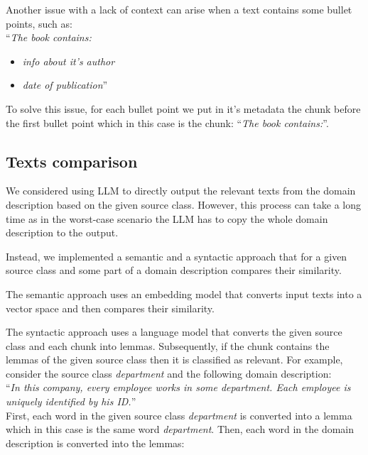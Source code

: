 Another issue with a lack of context can arise when a text contains some bullet points, such as: \\

\noindent{}``\textit{The book contains:}
\begin{itemize}
\item \textit{info about it's author}
\item \textit{date of publication}'' \\
\end{itemize}

\noindent{}To solve this issue, for each bullet point we put in it's metadata the chunk before the first bullet point which in this case is the chunk: ``\textit{The book contains:}''.



\subsection{Texts comparison}
\label{texts_comparison}
  
We considered using LLM to directly output the relevant texts from the domain description based on the given source class. However, this process can take a long time as in the worst-case scenario the LLM has to copy the whole domain description to the output.

Instead, we implemented a semantic and a syntactic approach that for a given source class and some part of a domain description compares their similarity.
 
The semantic approach uses an embedding model that converts input texts into a vector space and then compares their similarity.

The syntactic approach uses a language model that converts the given source class and each chunk into lemmas. Subsequently, if the chunk contains the lemmas of the given source class then it is classified as relevant. For example, consider the source class \textit{department} and the following domain description: \\

``\textit{In this company, every employee works in some department. Each employee is uniquely identified by his ID.}'' \\

First, each word in the given source class \textit{department} is converted into a lemma which in this case is the same word \textit{department}. Then, each word in the domain description is converted into the lemmas: \\

